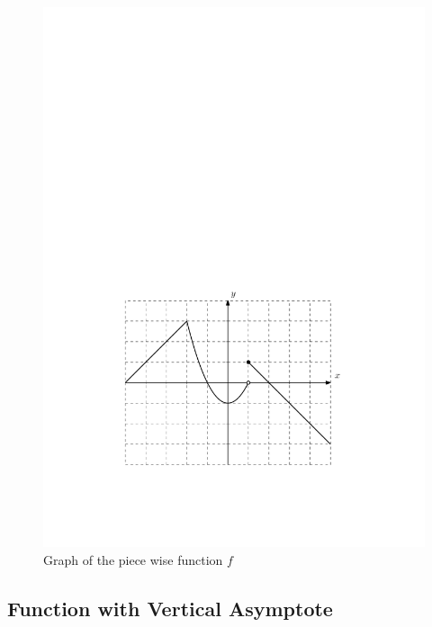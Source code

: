 \documentclass{article}
\begin{document}
\begin{figure}[h]
   \begin{center}
      \includegraphics[scale=.7]{piecewise.pdf}
   \end{center}
   \caption{Graph of the piece wise function $f$}
   \label{fig:piecewise}
\end{figure}
\clearpage

\subsection{Function with Vertical Asymptote}\label{subsec:asymptote}
\end{document}
